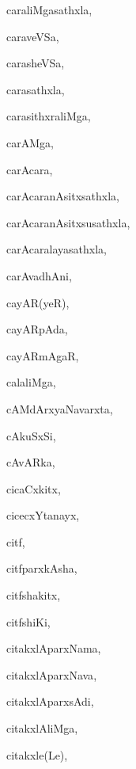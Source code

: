 \begin{multicols}{3}
{\noindent
{caraliMgasathxla}, \pageref{caraliMgasathxla}

\noindent
{caraveVSa}, \pageref{caraveVSa}

\noindent
{carasheVSa}, \pageref{carasheVSa}

\noindent
{carasathxla}, \pageref{carasathxla}

\noindent
{carasithxraliMga}, \pageref{carasithxraliMga}

\noindent
{carAMga}, \pageref{carAMga}

\noindent
{carAcara}, \pageref{carAcara}

\noindent
{carAcaranAsitxsathxla}, \pageref{carAcaranAsitxsathxla}

\noindent
{carAcaranAsitxsusathxla}, \pageref{carAcaranAsitxsusathxla}

\noindent
{carAcaralayasathxla}, \pageref{carAcaralayasathxla}

\noindent
{carAvadhAni}, \pageref{carAvadhAni}

\noindent
{cayAR(yeR)}, \pageref{cayAR(yeR)}

\noindent
{cayARpAda}, \pageref{cayARpAda}

\noindent
{cayARmAgaR}, \pageref{cayARmAgaR}

\noindent
{calaliMga}, \pageref{calaliMga}

\noindent
{cAMdArxyaNavarxta}, \pageref{cAMdArxyaNavarxta}

\noindent
{cAkuSxSi}, \pageref{cAkuSxSi}

\noindent
{cAvARka}, \pageref{cAvARka}

\noindent
{cicaCxkitx}, \pageref{cicaCxkitx}

\noindent
{cicecxYtanayx}, \pageref{cicecxYtanayx}

\noindent
{citf}, \pageref{citf}

\noindent
{citfparxkAsha}, \pageref{citfparxkAsha}

\noindent
{citfshakitx}, \pageref{citfshakitx}

\noindent
{citfshiKi}, \pageref{citfshiKi}

\noindent
{citakxlAparxNama}, \pageref{citakxlAparxNama}

\noindent
{citakxlAparxNava}, \pageref{citakxlAparxNava}

\noindent
{citakxlAparxsAdi}, \pageref{citakxlAparxsAdi}

\noindent
{citakxlAliMga}, \pageref{citakxlAliMga}

\noindent
{citakxle(Le)}, \pageref{citakxle(Le)}

}
\end{multicols}

